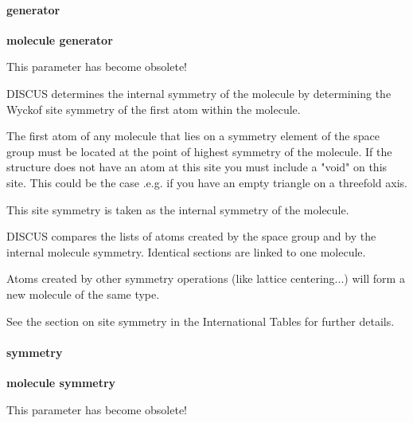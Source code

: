 \paragraph*{generator}
{\bf molecule generator \par }
\par
\vspace{3pt}
This parameter has become obsolete! 
\par
DISCUS determines the internal symmetry of the molecule by determining the 
Wyckof site symmetry of the first atom within the molecule. 
\par
The first atom of any molecule that lies on a symmetry element of the 
space group must be located at the point of highest symmetry of the 
molecule. If the structure does not have an atom at this site you must 
include a "void" on this site. This could be the case .e.g. if you have 
an empty triangle on a threefold axis. 
\par
This site symmetry is taken as the internal symmetry of the molecule. 
\par
DISCUS compares the lists of atoms created by the space group and by the 
internal molecule symmetry. Identical sections are linked to one molecule. 
\par
Atoms created by other symmetry operations (like lattice centering...) 
will form a new molecule of the same type. 
\par
See the section on site symmetry in the 
International Tables for further details. 
\paragraph*{symmetry}
{\bf molecule symmetry \par }
\par
\vspace{3pt}
This parameter has become obsolete! 
\par

